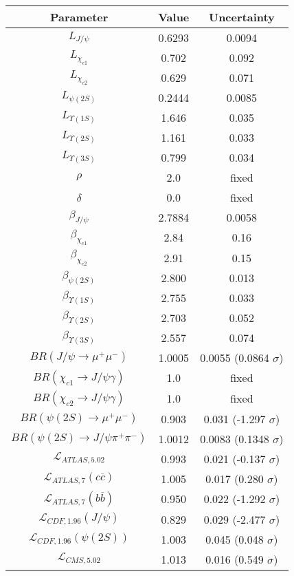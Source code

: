 \begin{table}[h!]
\centering
\begin{tabular}{c|c|c}
Parameter & Value & Uncertainty \\
\hline
$L_{J/\psi}$ & 0.6293 & 0.0094 \\
$L_{\chi_{c1}}$ & 0.702 & 0.092 \\
$L_{\chi_{c2}}$ & 0.629 & 0.071 \\
$L_{\psi(2S)}$ & 0.2444 & 0.0085 \\
$L_{\Upsilon(1S)}$ & 1.646 & 0.035 \\
$L_{\Upsilon(2S)}$ & 1.161 & 0.033 \\
$L_{\Upsilon(3S)}$ & 0.799 & 0.034 \\
$\rho$ & 2.0 & fixed \\
$\delta$ & 0.0 & fixed \\
$\beta_{J/\psi}$ & 2.7884 & 0.0058 \\
$\beta_{\chi_{c1}}$ & 2.84 & 0.16 \\
$\beta_{\chi_{c2}}$ & 2.91 & 0.15 \\
$\beta_{\psi(2S)}$ & 2.800 & 0.013 \\
$\beta_{\Upsilon(1S)}$ & 2.755 & 0.033 \\
$\beta_{\Upsilon(2S)}$ & 2.703 & 0.052 \\
$\beta_{\Upsilon(3S)}$ & 2.557 & 0.074 \\
$BR(J/\psi\rightarrow\mu^+\mu^-)$ & 1.0005 & 0.0055 (0.0864 $\sigma$) \\
$BR(\chi_{c1}\rightarrow J/\psi\gamma)$ & 1.0 & fixed \\
$BR(\chi_{c2}\rightarrow J/\psi\gamma)$ & 1.0 & fixed \\
$BR(\psi(2S)\rightarrow\mu^+\mu^-)$ & 0.903 & 0.031 (-1.297 $\sigma$) \\
$BR(\psi(2S)\rightarrow J/\psi\pi^+\pi^-)$ & 1.0012 & 0.0083 (0.1348 $\sigma$) \\
$\mathcal L_{ATLAS,5.02}$ & 0.993 & 0.021 (-0.137 $\sigma$) \\
$\mathcal L_{ATLAS,7}(c\overline c)$ & 1.005 & 0.017 (0.280 $\sigma$) \\
$\mathcal L_{ATLAS,7}(b\overline b)$ & 0.950 & 0.022 (-1.292 $\sigma$) \\
$\mathcal L_{CDF,1.96}(J/\psi)$ & 0.829 & 0.029 (-2.477 $\sigma$) \\
$\mathcal L_{CDF,1.96}(\psi(2S))$ & 1.003 & 0.045 (0.048 $\sigma$) \\
$\mathcal L_{CMS,5.02}$ & 1.013 & 0.016 (0.549 $\sigma$) \\

\end{tabular}
\end{table}
